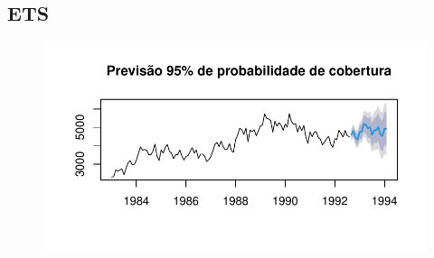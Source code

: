 \documentclass[
  letterpaper,
  DIV=11,
  numbers=noendperiod]{scrartcl}
\begin{document}
\newpage{}

\hypertarget{ets}{%
\subsection{ETS}\label{ets}}

\begin{figure}

{\centering \includegraphics{T2_grupo5_files/figure-pdf/previsao-pontual-ets-1.pdf}

}

\end{figure}
\end{document}
